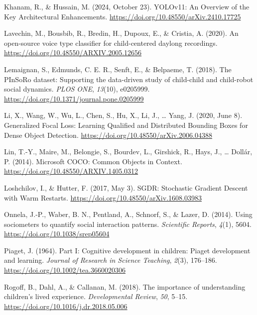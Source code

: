 \documentclass[
  man,floatsintext]{apa6}
\newlength{\cslhangindent}
\newenvironment{CSLReferences}[2] %
 {\begin{list}{}{%
  \setlength{\itemindent}{0pt}
  \setlength{\leftmargin}{0pt}
  \setlength{\parsep}{0pt}
  \ifodd #1
   \setlength{\leftmargin}{\cslhangindent}
   \setlength{\itemindent}{-1\cslhangindent}
  \fi
  \setlength{\itemsep}{#2\baselineskip}}}
 {\end{list}}
\begin{document}
\begin{CSLReferences}{1}{0}
Khanam, R., \& Hussain, M. (2024, October 23). {YOLOv11}: {An Overview} of the {Key Architectural Enhancements}. \url{https://doi.org/10.48550/arXiv.2410.17725}

Lavechin, M., Bousbib, R., Bredin, H., Dupoux, E., \& Cristia, A. (2020). An open-source voice type classifier for child-centered daylong recordings. \url{https://doi.org/10.48550/ARXIV.2005.12656}

Lemaignan, S., Edmunds, C. E. R., Senft, E., \& Belpaeme, T. (2018). The {PInSoRo} dataset: {Supporting} the data-driven study of child-child and child-robot social dynamics. \emph{PLOS ONE}, \emph{13}(10), e0205999. \url{https://doi.org/10.1371/journal.pone.0205999}

Li, X., Wang, W., Wu, L., Chen, S., Hu, X., Li, J., \ldots{} Yang, J. (2020, June 8). Generalized {Focal Loss}: {Learning Qualified} and {Distributed Bounding Boxes} for {Dense Object Detection}. \url{https://doi.org/10.48550/arXiv.2006.04388}

Lin, T.-Y., Maire, M., Belongie, S., Bourdev, L., Girshick, R., Hays, J., \ldots{} Dollár, P. (2014). Microsoft {COCO}: {Common Objects} in {Context}. \url{https://doi.org/10.48550/ARXIV.1405.0312}

Loshchilov, I., \& Hutter, F. (2017, May 3). {SGDR}: {Stochastic Gradient Descent} with {Warm Restarts}. \url{https://doi.org/10.48550/arXiv.1608.03983}

Onnela, J.-P., Waber, B. N., Pentland, A., Schnorf, S., \& Lazer, D. (2014). Using sociometers to quantify social interaction patterns. \emph{Scientific Reports}, \emph{4}(1), 5604. \url{https://doi.org/10.1038/srep05604}

Piaget, J. (1964). Part {I}: {Cognitive} development in children: {Piaget} development and learning. \emph{Journal of Research in Science Teaching}, \emph{2}(3), 176--186. \url{https://doi.org/10.1002/tea.3660020306}

Rogoff, B., Dahl, A., \& Callanan, M. (2018). The importance of understanding children's lived experience. \emph{Developmental Review}, \emph{50}, 5--15. \url{https://doi.org/10.1016/j.dr.2018.05.006}


\end{CSLReferences}
\end{document}
